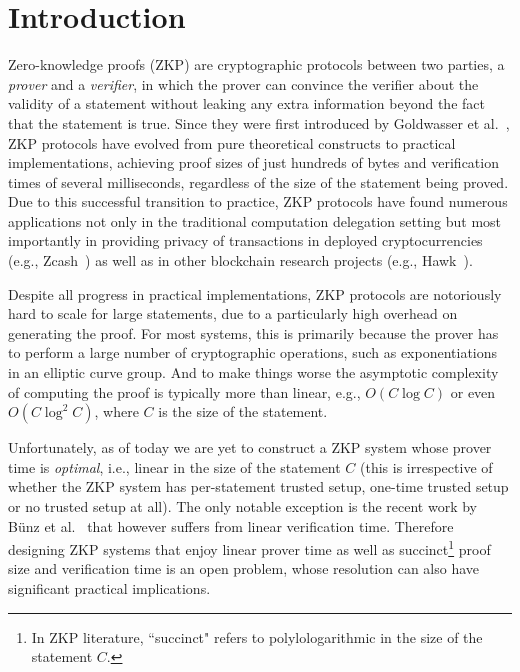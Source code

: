 \section{Introduction}\label{sec:intro}


Zero-knowledge proofs (ZKP) are cryptographic protocols between two parties, a \emph{prover} and a \emph{verifier}, in which the prover can convince the verifier about the validity of a statement without leaking any extra information beyond the fact that the statement is true.  Since they were first introduced by Goldwasser et al.~\cite{goldwasser1989knowledge}, ZKP protocols have evolved from pure theoretical constructs to practical implementations, achieving proof sizes  of just hundreds of bytes and verification times of several milliseconds, regardless of the size of the statement being proved. Due to this successful transition to practice, ZKP protocols have found numerous applications not only in the traditional computation delegation setting but most importantly in providing privacy of transactions in deployed cryptocurrencies (e.g., Zcash~\cite{zerocash}) as well as in other blockchain research projects (e.g., Hawk~\cite{kosba2016hawk}). 




 




 




Despite all progress in practical implementations, ZKP protocols are notoriously hard to scale for large statements, due to a particularly high overhead on generating the proof. For most systems, this is primarily because the prover has to  perform a large number of cryptographic operations, such as exponentiations in an elliptic curve group. And to make things worse the asymptotic complexity of computing the proof is typically more than linear, e.g., $O(C\log C)$ or even $O(C\log^2 C)$, where $C$ is the size of the statement.

Unfortunately, as of today we are yet to construct a ZKP system whose prover time is \emph{optimal}, i.e., linear in the size of the statement $C$ (this is irrespective of whether the ZKP system has per-statement trusted setup, one-time trusted setup or no trusted setup at all). The only notable exception is the recent work by B{\"u}nz et al.~\cite{bulletproofs} that however suffers from linear verification time. Therefore designing ZKP systems that enjoy linear prover time as well as succinct\footnote{In ZKP literature, ``succinct" refers to polylologarithmic in the size of the statement $C$.} proof size and verification time is an open problem, whose resolution can also have significant practical implications. 



